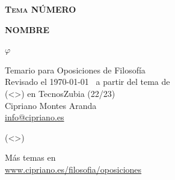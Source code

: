 \documentclass[12pt]{article}
\begin{document}
\begin{titlepage}
        \begin{center}
                \vspace*{0.5cm}

                \Huge
		\textbf{\scshape Tema NÚMERO} %

                \vspace{0.5cm}
                \LARGE
		\textbf{NOMBRE}\\ %
                \vfill

                \Huge
		{\fontsize{225pt}{45pt}\selectfont $\varphi$} %

                \vfill
                \large
		Temario para Oposiciones de Filosofía\\

                \vspace{0.25cm}
		\normalsize
		Revisado el \today~ a partir del tema de \\(<>) en TecnosZubia (22/23)\\ %

                \vspace{0.75cm}
		\Large
                Cipriano Montes Aranda\\
                \large
                \href{mailto:info@cipriano.es}{info@cipriano.es} %
 \end{center}
\end{titlepage}

\pagestyle{empty}

\onehalfspace


\newpage

\normalsize

\pagestyle{fancy}

(<>)

\newpage

\printbibliography

\newpage

\renewcommand*\contentsname{Índice detallado}
\tableofcontents

\newpage

\pagestyle{empty}

\begin{center}
	\vspace*{\fill}
		\Large
		Más temas en\\
                \large
                \href{https://www.cipriano.es/filosofia/oposiciones}{www.cipriano.es/filosofia/oposiciones} %
	\vspace*{\fill}
\end{center}
\end{document}
